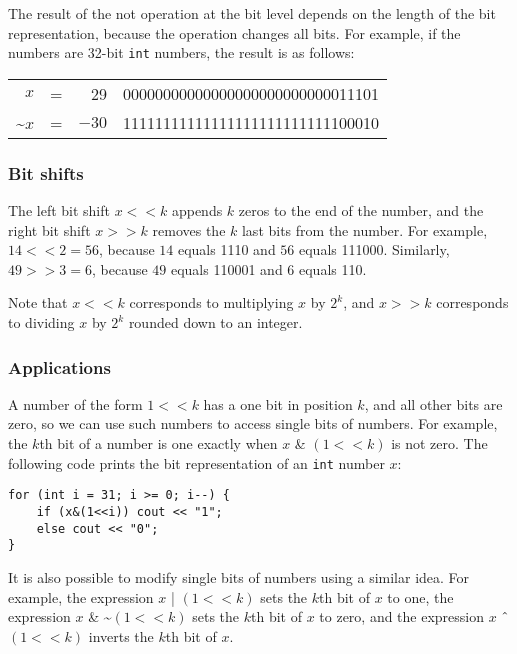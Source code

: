 The result of the not operation at the bit level
depends on the length of the bit representation,
because the operation changes all bits.
For example, if the numbers are 32-bit
\texttt{int} numbers, the result is as follows:

\begin{center}
\begin{tabular}{rrrr}
$x$ & = & 29 &   00000000000000000000000000011101 \\
\textasciitilde$x$ & = & $-30$ & 11111111111111111111111111100010 \\
\end{tabular}
\end{center}

\subsubsection{Bit shifts}


The left bit shift $x < < k$ appends $k$
zeros to the end of the number,
and the right bit shift $x > > k$
removes the $k$ last bits from the number.
For example, $14 < < 2 = 56$,
because $14$ equals 1110
and $56$ equals 111000.
Similarly, $49 > > 3 = 6$,
because $49$ equals 110001
and $6$ equals 110.

Note that $x < < k$
corresponds to multiplying $x$ by $2^k$,
and $x > > k$
corresponds to dividing $x$ by $2^k$
rounded down to an integer.

\subsubsection{Applications}

A number of the form $1 < < k$ has a one bit
in position $k$, and all other bits are zero,
so we can use such numbers to access single bits of numbers.
For example, the $k$th bit of a number is one
exactly when $x$ \& $(1 < < k)$ is not zero.
The following code prints the bit representation
of an \texttt{int} number $x$:

\begin{lstlisting}
for (int i = 31; i >= 0; i--) {
    if (x&(1<<i)) cout << "1";
    else cout << "0";
}
\end{lstlisting}

It is also possible to modify single bits
of numbers using a similar idea.
For example, the expression $x$ | $(1 < < k)$
sets the $k$th bit of $x$ to one,
the expression
$x$ \& \textasciitilde $(1 < < k)$
sets the $k$th bit of $x$ to zero,
and the expression
$x$ $\XOR$ $(1 < < k)$
inverts the $k$th bit of $x$.

